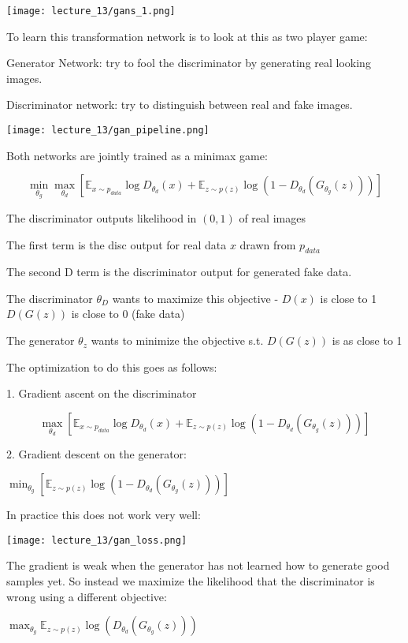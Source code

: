 \texttt{[image: lecture\_13/gans\_1.png]}



To learn this transformation network is to look at this as two player game:

Generator Network: try to fool the discriminator by generating real looking images.

Discriminator network: try to distinguish between real and fake images.

\texttt{[image: lecture\_13/gan\_pipeline.png]}

Both networks are jointly trained as a minimax game:

$$ \min_{\theta_g} \max_{\theta_d} \left[ \mathbb{E}_{x\sim p_{data}}\log D_{\theta_d}(x)+\mathbb{E}_{z\sim p(z)}\log(1-D_{\theta_d}(G_{\theta_g}(z))) \right]$$

The discriminator outputs likelihood in  $(0,1)$ of real images

The first term is the disc output for real data $x$ drawn from $p_{data}$

The second D term is the discriminator output for generated fake data.

The discriminator $\theta_D$ wants to maximize this objective - $D(x)$ is close to 1 $D(G(z))$ is close to 0 (fake data)

The generator $\theta_z$  wants to minimize the objective s.t. $D(G(z))$ is as close to 1

The optimization to do this goes as follows: 

1. Gradient ascent on the discriminator

   $$ \max_{\theta_d} \left[ \mathbb{E}_{x\sim p_{data}}\log D_{\theta_d}(x)+\mathbb{E}_{z\sim p(z)}\log(1-D_{\theta_d}(G_{\theta_g}(z))) \right]$$

2. Gradient descent on the generator:

   $\min_{\theta_g} \left[ \mathbb{E}_{z\sim p(z)}\log(1-D_{\theta_d}(G_{\theta_g}(z))) \right]$

In practice this does not work very well:

\texttt{[image: lecture\_13/gan\_loss.png]}

The gradient is weak when the generator has not learned how to generate good samples yet. So instead we maximize the likelihood that the discriminator is wrong using a different objective:

$\max_{\theta_g} \mathbb{E}_{z\sim p(z)}\log(D_{\theta_d}(G_{\theta_g}(z)))  $

